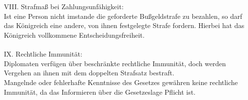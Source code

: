 \documentclass{article}
\begin{document}
\\\\
VIII. Strafmaß bei Zahlungsunfähigkeit:\\Ist eine Person nicht imstande die geforderte Bußgeldstrafe zu bezahlen, so darf das Königreich eine andere, von ihnen festgelegte Strafe fordern. Hierbei hat das Königreich vollkommene Entscheidungsfreiheit.
\\\\
IX. Rechtliche Immunität:\\Diplomaten verfügen über beschränkte rechtliche Immunität, doch werden Vergehen an ihnen mit dem doppelten Strafsatz bestraft.\\Mangelnde oder fehlerhafte Kenntnisse des Gesetzes gewähren keine rechtliche Immunität, da das Informieren über die Gesetzeslage Pflicht ist.
\end{document}
